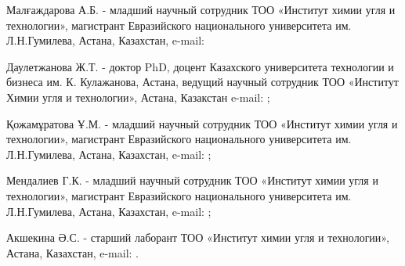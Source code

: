 Малғаждарова А.Б. - младший научный сотрудник ТОО «Институт химии угля и
технологии», магистрант Евразийского национального университета им.
Л.Н.Гумилева, Астана, Казахстан, e-mail:


Даулетжанова Ж.Т. - доктор PhD, доцент Казахского университета
технологии и бизнеса им. К. Кулажанова, Астана, ведущий научный
сотрудник ТОО «Институт Химии угля и технологии», Астана, Казакстан
e-mail:
\href{mailto:kaliyeva_zhanna@mail.ru}{};

Қожамұратова Ұ.М. - младший научный сотрудник ТОО «Институт химии угля и
технологии», магистрант Евразийского национального университета им.
Л.Н.Гумилева, Астана, Казахстан, e-mail:
\href{mailto:kozhamuratova.u@mail.ru}{};

Мендалиев Г.К. - младший научный сотрудник ТОО «Институт химии угля и
технологии», магистрант Евразийского национального университета им.
Л.Н.Гумилева, Астана, Казахстан, e-mail:
\href{mailto:ganimen02@mail.ru}{};

Акшекина Ә.С. - старший лаборант ТОО «Институт химии угля и технологии»,
Астана, Казахстан, e-mail:
\href{mailto:akshekina11@gmail.com}{}.\

